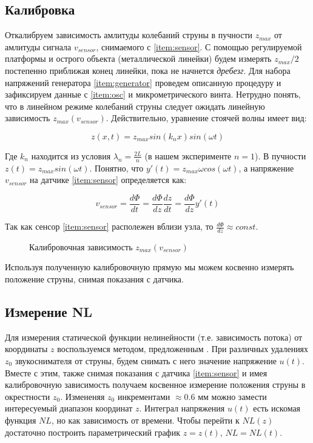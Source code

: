 \documentclass{article}
\begin{document}
\subsection{Калибровка}

Откалибруем зависимость амлитуды колебаний струны в пучности $z_{max}$ от амлитуды сигнала $v_{sensor}$, снимаемого с \ref{item:sensor}.
С помощью регулируемой платформы и острого объекта (металлической линейки) будем измерять $z_{max}/2$ постепенно приближая
конец линейки, пока не начнется \textit{дребезг}. Для набора напряжений генератора \ref{item:generator} проведем описанную процедуру
и зафиксируем данные с \ref{item:osc} и микрометрического винта. Нетрудно понять, что в линейном режиме колебаний струны следует ожидать
линейную зависимость $z_{max}(v_{sensor})$. Действительно, уравнение стоячей волны имеет вид:

\begin{equation}
    z(x, t) = z_{max} sin(k_n x) sin(\omega t)
\end{equation}

Где $k_n$ находится из условия $\lambda_n = \frac{2 L}{n}$ (в нашем эксперименте $n = 1$).
В пучности $z(t) = z_{max} sin(\omega t)$. Понятно, что $y'(t) = z_{max} \omega cos(\omega t)$, а напряжение $v_{sensor}$
на датчике \ref{item:sensor} определяется как:

\begin{equation}
    v_{sensor} = \frac{d \Phi}{dt} = \frac{d \Phi}{dz} \frac{dz}{dt} = \frac{d \Phi}{dz} y'(t)
\end{equation}

Так как сенсор \ref{item:sensor} располежен вблизи узла, то $\frac{d \Phi}{dz} \approx const$.

\begin{figure}[h]
    \centering
    
    \caption{Калибровочная зависимость $z_{max}(v_{sensor})$}
    \label{fig:model}
\end{figure}

Используя полученную калибровочную прямую мы можем косвенно измерять положение струны, 
снимая показания с датчика.

\pagebreak

\subsection{Измерение NL}

Для измерения статической функции нелинейности (т.е. зависимость потока) от координаты $z$
воспользуемся методом, предложенным \cite{novak:hal-02512148}. При различных удалениях $z_0$ звукоснимателя от струны,
будем снимать с него значение напряжение $u(t)$. Вместе с этим, также снимая показания с датчика \ref{item:sensor} и имея
калибровочную зависимость получаем косвенное измерение положения струны в окрестности $z_0$. Измененяя $z_0$ инкрементами 
$\approx 0.6$ мм можно замести интересуемый диапазон координат $z$. Интеграл напряжения $u(t)$ есть искомая функция $NL$, но как
зависимость от времени. Чтобы перейти к $NL(z)$ достаточно построить параметрический график $z = z(t)$, $NL = NL(t)$. 
\end{document}
